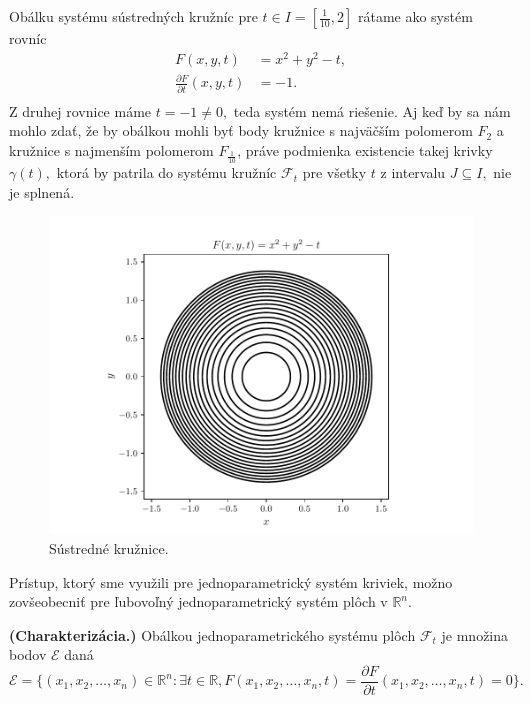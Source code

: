 \begin{example} 
Obálku systému sústredných kružníc pre $t \in I=[\frac{1}{10},2]$ rátame ako systém rovníc
\begin{align*}
F(x, y, t) &= x^2 + y^2 - t, \\
\frac{\partial F}{\partial t}(x,y,t) &= -1. \\
\end{align*}
Z druhej rovnice máme $t=-1 \neq 0,$ teda systém nemá riešenie. Aj keď by sa nám mohlo zdať, že by obálkou mohli byť body kružnice s najväčším polomerom $F_2$ a kružnice s najmenším polomerom $F_{\frac{1}{10}}$, práve podmienka existencie takej krivky $\gamma(t),$ ktorá by patrila do systému kružníc $\mathcal{F}_t$ pre všetky $t$ z intervalu $J \subseteq  I, $ nie je splnená.
\end{example}

\begin{figure}[H]
	\centering
	\includegraphics{images/concentric_circles.pdf}
	\caption{Sústredné kružnice.}
	\label{fig:concentric_circles}
\end{figure}


Prístup, ktorý sme využili pre jednoparametrický systém kriviek, možno zovšeobecniť pre ľubovoľný jednoparametrický systém plôch v $\mathbb{R}^n.$

\begin{definition}{\textbf{\textup{(Charakterizácia.)}}}
\label{charakterizacia}
Obálkou jednoparametrického systému plôch $ \mathcal{F}_{t} $ je množina bodov $\mathcal{E}$ daná
$$\mathcal{E} = \{(x_{1}, x_{2}, \dots, x_{n})  \in \mathbb{R}^{n} \colon \exists t \in \mathbb{R}, F(x_{1}, x_{2}, \dots, x_{n}, t) = \frac{\partial F}{\partial t}(x_{1}, x_{2}, \dots, x_{n}, t) = 0 \}.$$
\end{definition}

